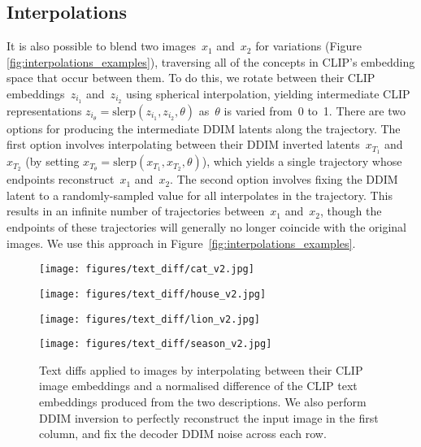 \documentclass{article}
\begin{document}
\subsection{Interpolations}
\label{sec:interpolations}
It is also possible to blend two images~$x_1$ and~$x_2$ for variations (Figure \ref{fig:interpolations_examples}), traversing all of the concepts in CLIP's embedding space that occur between them. To do this, we rotate between their CLIP embeddings~$z_{i_1}$ and~$z_{i_2}$ using spherical interpolation, yielding intermediate CLIP representations $z_{i_\theta} = \text{slerp}(z_{i_1}, z_{i_2}, \theta)$ as~$\theta$ is varied from~0 to~1. There are two options for producing the intermediate DDIM latents along the trajectory. The first option involves interpolating between their DDIM inverted latents~$x_{T_1}$ and~$x_{T_2}$ (by setting $x_{T_\theta} = \text{slerp}(x_{T_1}, x_{T_2}, \theta)$), which yields a single trajectory whose endpoints reconstruct~$x_1$ and~$x_2$. The second option involves fixing the DDIM latent to a randomly-sampled value for all interpolates in the trajectory. This results in an infinite number of trajectories between~$x_1$ and~$x_2$, though the endpoints of these trajectories will generally no longer coincide with the original images. We use this approach in Figure~\ref{fig:interpolations_examples}.

\begin{figure*}[t]
    \centering
    \texttt{[image: figures/text\_diff/cat\_v2.jpg]}
    \vspace{0.05in}
    \scriptsize {}

    \texttt{[image: figures/text\_diff/house\_v2.jpg]}
    \vspace{0.05in}
    \scriptsize {}

    \texttt{[image: figures/text\_diff/lion\_v2.jpg]}
    \vspace{0.05in}
    \scriptsize {}
    
    \texttt{[image: figures/text\_diff/season\_v2.jpg]}
    \vspace{0.05in}
    \scriptsize {}
    
    \caption{Text diffs applied to images by interpolating between their CLIP image embeddings and a normalised difference of the CLIP text embeddings produced from the two descriptions. We also perform DDIM inversion to perfectly reconstruct the input image in the first column, and fix the decoder DDIM noise across each row. }
    \label{fig:text_diffs}
    \vskip -0.2in 
\end{figure*}
\end{document}
